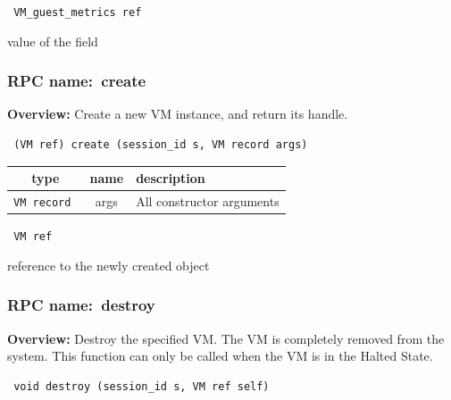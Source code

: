 \vspace{0.3cm}

{\tt 
VM\_guest\_metrics ref
}


value of the field
\vspace{0.3cm}
\vspace{0.3cm}
\vspace{0.3cm}
\subsubsection{RPC name:~create}

{\bf Overview:} 
Create a new VM instance, and return its handle.

\begin{verbatim} (VM ref) create (session_id s, VM record args)\end{verbatim}



 
\vspace{0.3cm}
\begin{tabular}{|c|c|p{7cm}|}
 \hline
{\bf type} & {\bf name} & {\bf description} \\ \hline
{\tt VM record } & args & All constructor arguments \\ \hline 

\end{tabular}

\vspace{0.3cm}

{\tt 
VM ref
}


reference to the newly created object
\vspace{0.3cm}
\vspace{0.3cm}
\vspace{0.3cm}
\subsubsection{RPC name:~destroy}

{\bf Overview:} 
Destroy the specified VM.  The VM is completely removed from the system. 
This function can only be called when the VM is in the Halted State.

\begin{verbatim} void destroy (session_id s, VM ref self)\end{verbatim}



